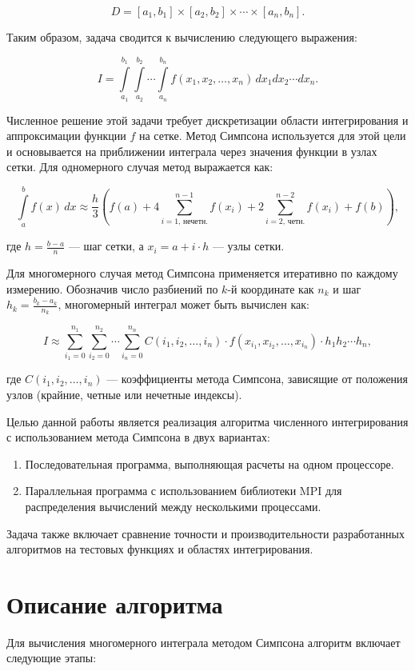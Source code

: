 \documentclass{report}
\begin{document}
\[
D = [a_1, b_1] \times [a_2, b_2] \times \cdots \times [a_n, b_n].
\]

Таким образом, задача сводится к вычислению следующего выражения:

\[
I = \int\limits_{a_1}^{b_1} \int\limits_{a_2}^{b_2} \cdots \int\limits_{a_n}^{b_n} f(x_1, x_2, \ldots, x_n) \, dx_1 dx_2 \cdots dx_n.
\]

Численное решение этой задачи требует дискретизации области интегрирования и аппроксимации функции \( f \) на сетке. Метод Симпсона используется для этой цели и основывается на приближении интеграла через значения функции в узлах сетки. Для одномерного случая метод выражается как:

\[
\int\limits_a^b f(x) \, dx \approx \frac{h}{3} \left( f(a) + 4 \sum_{i=1, \, \text{нечетн.}}^{n-1} f(x_i) + 2 \sum_{i=2, \, \text{четн.}}^{n-2} f(x_i) + f(b) \right),
\]

где \( h = \frac{b-a}{n} \) — шаг сетки, а \( x_i = a + i \cdot h \) — узлы сетки.

Для многомерного случая метод Симпсона применяется итеративно по каждому измерению. Обозначив число разбиений по \( k \)-й координате как \( n_k \) и шаг \( h_k = \frac{b_k - a_k}{n_k} \), многомерный интеграл может быть вычислен как:

\[
I \approx \sum_{i_1=0}^{n_1} \sum_{i_2=0}^{n_2} \cdots \sum_{i_n=0}^{n_n} C(i_1, i_2, \ldots, i_n) \cdot f(x_{i_1}, x_{i_2}, \ldots, x_{i_n}) \cdot h_1 h_2 \cdots h_n,
\]

где \( C(i_1, i_2, \ldots, i_n) \) — коэффициенты метода Симпсона, зависящие от положения узлов (крайние, четные или нечетные индексы).

Целью данной работы является реализация алгоритма численного интегрирования с использованием метода Симпсона в двух вариантах:
\begin{enumerate}
    \item Последовательная программа, выполняющая расчеты на одном процессоре.
    \item Параллельная программа с использованием библиотеки MPI для распределения вычислений между несколькими процессами.
\end{enumerate}

Задача также включает сравнение точности и производительности разработанных алгоритмов на тестовых функциях и областях интегрирования.

\newpage
\section*{Описание алгоритма}
Для вычисления многомерного интеграла методом Симпсона алгоритм включает следующие этапы:
\end{document}
